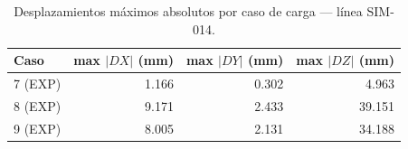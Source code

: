 \begin{table}[htbp]
  \centering
  \small
  \caption{Desplazamientos máximos absolutos por caso de carga — línea SIM-014.}
  \label{tab:desplaz-max}
  \begin{tabular}{lrrr}
    \toprule
    Caso & max $|DX|$ (\si{mm}) & max $|DY|$ (\si{mm}) & max $|DZ|$ (\si{mm}) \\
    \midrule
    7 (EXP) & 1.166 & 0.302 & 4.963 \\
    8 (EXP) & 9.171 & 2.433 & 39.151 \\
    9 (EXP) & 8.005 & 2.131 & 34.188 \\
    \bottomrule
  \end{tabular}
\end{table}
